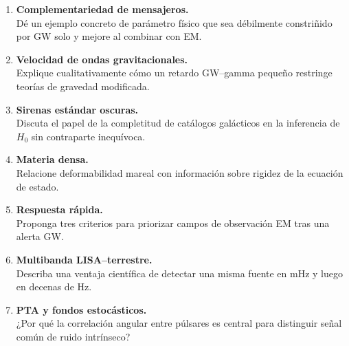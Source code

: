 \begin{enumerate}[leftmargin=2.2em, label=\textbf{P\arabic*.}]

\item \textbf{Complementariedad de mensajeros.} \\
Dé un ejemplo concreto de parámetro físico que sea débilmente constriñido por GW solo y mejore al combinar con EM.

\item \textbf{Velocidad de ondas gravitacionales.} \\
Explique cualitativamente cómo un retardo GW--gamma pequeño restringe teorías de gravedad modificada.

\item \textbf{Sirenas estándar oscuras.} \\
Discuta el papel de la completitud de catálogos galácticos en la inferencia de $H_0$ sin contraparte inequívoca.

\item \textbf{Materia densa.} \\
Relacione deformabilidad mareal con información sobre rigidez de la ecuación de estado.

\item \textbf{Respuesta rápida.} \\
Proponga tres criterios para priorizar campos de observación EM tras una alerta GW.

\item \textbf{Multibanda LISA--terrestre.} \\
Describa una ventaja científica de detectar una misma fuente en mHz y luego en decenas de Hz.

\item \textbf{PTA y fondos estocásticos.} \\
¿Por qué la correlación angular entre púlsares es central para distinguir señal común de ruido intrínseco?

\end{enumerate}
